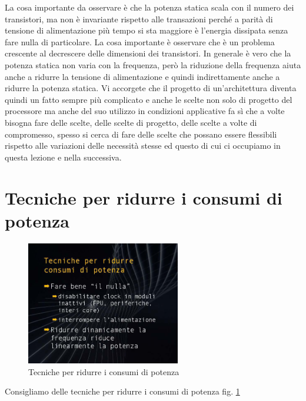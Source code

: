 La cosa importante da osservare è che la potenza statica scala con il numero dei transistori, ma non è invariante rispetto alle transazioni perché a parità di tensione di alimentazione più tempo si sta maggiore è l'energia dissipata senza fare nulla di particolare.
La cosa importante è osservare che è un problema crescente al decrescere delle dimensioni dei transistori.
In generale è vero che la potenza statica non varia con la frequenza, però la riduzione della frequenza aiuta anche a ridurre la tensione di alimentazione e quindi indirettamente anche a ridurre la potenza statica.
Vi accorgete che il progetto di un'architettura diventa quindi un fatto sempre più complicato e anche le scelte non solo di progetto del processore ma anche del suo utilizzo in condizioni applicative fa sì che a volte bisogna fare delle scelte, delle scelte di progetto, delle scelte a volte di compromesso, spesso si cerca di fare delle scelte che possano essere flessibili rispetto alle variazioni delle necessità stesse ed questo di cui ci occupiamo in questa lezione e nella successiva.

\section{Tecniche per ridurre i consumi di potenza}

\FloatBarrier
\begin{figure}[H]
  \centering
  \includegraphics[width=0.6\textwidth,
                    trim=40 40 45 40, %
                    clip]{images/Lez02_p02_fig_01.png}
  \caption{Tecniche per ridurre i consumi di potenza}
  \label{fig:Lez02_p02_fig_01}
\end{figure}
\FloatBarrier
\noindent

Consigliamo delle tecniche per ridurre i consumi di potenza fig. \ref{fig:Lez02_p02_fig_01}

